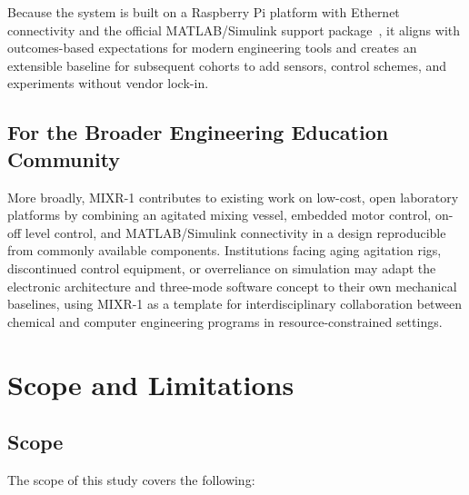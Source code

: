 Because the system is built on a Raspberry Pi platform with Ethernet connectivity and the official MATLAB/Simulink support package~\citep{mathworks2026}, it aligns with outcomes-based expectations for modern engineering tools and creates an extensible baseline for subsequent cohorts to add sensors, control schemes, and experiments without vendor lock-in.

\subsection{For the Broader Engineering Education Community} %

More broadly, MIXR-1 contributes to existing work on low-cost, open laboratory platforms by combining an agitated mixing vessel, embedded motor control, on-off level control, and MATLAB/Simulink connectivity in a design reproducible from commonly available components. Institutions facing aging agitation rigs, discontinued control equipment, or overreliance on simulation may adapt the electronic architecture and three-mode software concept to their own mechanical baselines, using MIXR-1 as a template for interdisciplinary collaboration between chemical and computer engineering programs in resource-constrained settings.


\section{Scope and Limitations}  %
\label{sec:scope}

\subsection{Scope} %
\label{subsec:scope}

The scope of this study covers the following:


